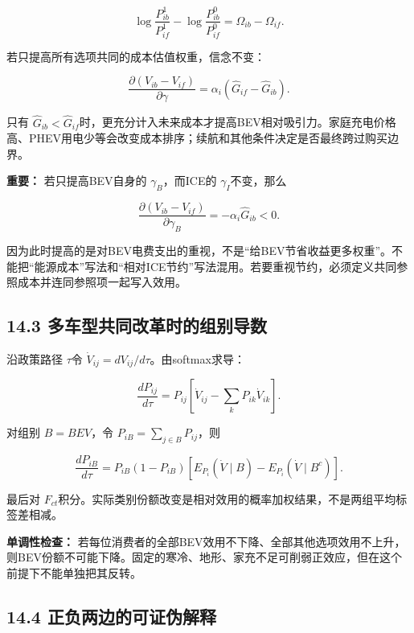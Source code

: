 \documentclass[
  11pt,
]{article}
\begin{document}
\[
\log\frac{P_{ib}^{1}}{P_{if}^{1}}
-\log\frac{P_{ib}^{0}}{P_{if}^{0}}
=\Omega_{ib}-\Omega_{if}.
\tag{59}
\]

若只提高所有选项共同的成本估值权重，信念不变：

\[
\frac{\partial(V_{ib}-V_{if})}{\partial\gamma}
=\alpha_i(\widehat G_{if}-\widehat G_{ib}).
\tag{60}
\]

只有
\(\widehat G_{ib}<\widehat G_{if}\)时，更充分计入未来成本才提高BEV相对吸引力。家庭充电价格高、PHEV用电少等会改变成本排序；续航和其他条件决定是否最终跨过购买边界。

\textbf{重要：} 若只提高BEV自身的 \(\gamma_B\)，而ICE的
\(\gamma_I\)不变，那么

\[
\frac{\partial(V_{ib}-V_{if})}{\partial\gamma_B}
=-\alpha_i\widehat G_{ib}<0. \tag{61}
\]

因为此时提高的是对BEV电费支出的重视，不是``给BEV节省收益更多权重''。不能把``能源成本''写法和``相对ICE节约''写法混用。若要重视节约，必须定义共同参照成本并连同参照项一起写入效用。

\subsection{14.3
多车型共同改革时的组别导数}\label{ux591aux8f66ux578bux5171ux540cux6539ux9769ux65f6ux7684ux7ec4ux522bux5bfcux6570}

沿政策路径 \(\tau\)令 \(\dot V_{ij}=dV_{ij}/d\tau\)。由softmax求导：

\[
\frac{dP_{ij}}{d\tau}
=P_{ij}\left[\dot V_{ij}-\sum_kP_{ik}\dot V_{ik}\right]. \tag{62}
\]

对组别 \(B=BEV\)，令 \(P_{iB}=\sum_{j\in B}P_{ij}\)，则

\[
\frac{dP_{iB}}{d\tau}
=P_{iB}(1-P_{iB})
\left[E_{P_i}(\dot V\mid B)-E_{P_i}(\dot V\mid B^c)\right].
\tag{63}
\]

最后对
\(F_{ct}\)积分。实际类别份额改变是相对效用的概率加权结果，不是两组平均标签差相减。

\textbf{单调性检查：}
若每位消费者的全部BEV效用不下降、全部其他选项效用不上升，则BEV份额不可能下降。固定的寒冷、地形、家充不足可削弱正效应，但在这个前提下不能单独把其反转。

\subsection{14.4
正负两边的可证伪解释}\label{ux6b63ux8d1fux4e24ux8fb9ux7684ux53efux8bc1ux4f2aux89e3ux91ca}
\end{document}
